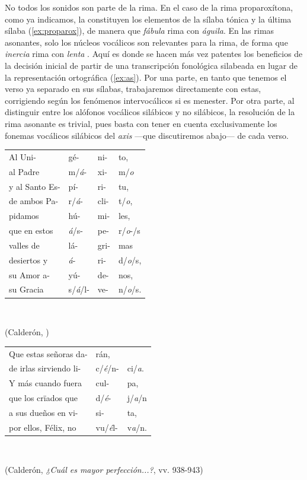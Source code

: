 No todos los sonidos son parte de la rima. En el caso de la rima proparoxítona, como ya indicamos, la constituyen los elementos de la sílaba tónica y la última sílaba (\ref{ex:proparox}), de manera que \textit{fábula} rima con \textit{águila}. En las rimas asonantes, solo los núcleos vocálicos son relevantes para la rima, de forma que \textit{inercia} rima con \textit{lenta} \parencite[89]{herrero1996}. Aquí es donde se hacen más vez patentes los beneficios de la decisión inicial de partir de una transcripción fonológica silabeada en lugar de la representación ortográfica (\ref{ex:as}). Por una parte, en tanto que tenemos el verso ya separado en sus sílabas, trabajaremos directamente con estas, corrigiendo según los fenómenos intervocálicos si es menester. Por otra parte, al distinguir entre los alófonos vocálicos silábicos y no silábicos, la resolución de la rima asonante es trivial, pues basta con tener en cuenta exclusivamente los fonemas vocálicos silábicos del \textit{axis} —que discutiremos abajo— de cada verso.

\begin{exe}
	\ex\label{ex:proparox}
	\begin{tabular}{l|l|l|l|}\cline{2-2}\cline{4-4}
	Al Uni-&gé-&ni-&to,\\
	al Padre &m/\textit{á}-&xi-&m/\textit{o}\\
	y al Santo Es-&pí-&ri-&tu,\\
	de ambos Pa-&r/\textit{á}-&cli-&t/\textit{o},\\
	pidamos &hú-&mi-&les,\\
	que en estos &\textit{á}/s-&pe-&r/\textit{o}-/s\\
	valles de &lá-&gri-&mas\\
	desiertos y &\textit{á}-&ri-&d/\textit{o}/s,\\
	su Amor a-&yú-&de-&nos,\\
	su Gracia &s/\textit{á}/l-&ve-&n/\textit{o}/s.\\
	\cline{2-2}\cline{4-4}
\end{tabular}\\
	\strut\hfill(Calderón, )
\ex\label{ex:as}
	\begin{tabular}{l|ll|}\cline{2-3}
Que estas señoras da-&rán,&\\
de irlas sirviendo li-&c/\textit{é}/n-&ci/\textit{a}.\\
Y más cuando fuera& cul-&pa,\\
que los crïados que& d/\textit{é}-&j/\textit{a}/n\\
a sus dueños en vi-&si-&ta,\\
por ellos, Félix, no& vu/\textit{é}l-&v\textit{a}/n.\\
\cline{2-3}
\end{tabular}\\
	\strut\hfill(Calderón, \textit{¿Cuál es mayor perfección...?}, vv. 938-943\nocite{calderon_mayorperfeccion})
\end{exe}

